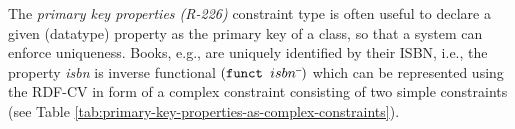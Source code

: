 \documentclass[a4paper,fontsize=11pt]{scrartcl}
\newcommand{\ms}[1]{\texttt{#1}}
\begin{document}
%
%
%
The \emph{primary key properties (R-226)} constraint type is often useful to declare a given (datatype) property as the primary key of a class, so that a system can enforce uniqueness. 
Books, e.g., are uniquely identified by their ISBN, i.e., the property \emph{isbn} is inverse functional \ms{$(\ms{funct } isbn\sp{\overline{\ }})$}
which can be represented using the RDF-CV in form of a complex constraint consisting of two simple constraints (see Table \ref{tab:primary-key-properties-as-complex-constraints}).

\end{document}
